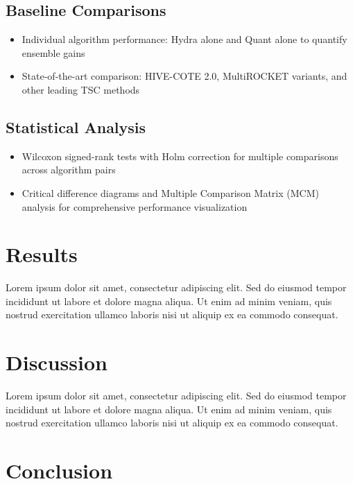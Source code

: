 \documentclass[pdflatex,sn-basic]{sn-jnl}           %
\theoremstyle{thmstyleone}%
\theoremstyle{thmstyletwo}%
\theoremstyle{thmstylethree}%
\begin{document}
\subsection{Baseline Comparisons}
\begin{itemize}
\item Individual algorithm performance: Hydra alone and Quant alone to quantify ensemble gains
\item State-of-the-art comparison: HIVE-COTE 2.0, MultiROCKET variants, and other leading TSC methods
\end{itemize}

\subsection{Statistical Analysis}
\begin{itemize}
\item Wilcoxon signed-rank tests with Holm correction for multiple comparisons across algorithm pairs
\item Critical difference diagrams and Multiple Comparison Matrix (MCM) analysis for comprehensive performance visualization
\end{itemize}

\section{Results}\label{sec5}

Lorem ipsum dolor sit amet, consectetur adipiscing elit. Sed do eiusmod tempor incididunt ut labore et dolore magna aliqua. Ut enim ad minim veniam, quis nostrud exercitation ullamco laboris nisi ut aliquip ex ea commodo consequat.

\section{Discussion}\label{sec6}

Lorem ipsum dolor sit amet, consectetur adipiscing elit. Sed do eiusmod tempor incididunt ut labore et dolore magna aliqua. Ut enim ad minim veniam, quis nostrud exercitation ullamco laboris nisi ut aliquip ex ea commodo consequat.

\section{Conclusion}\label{sec13}
\end{document}
